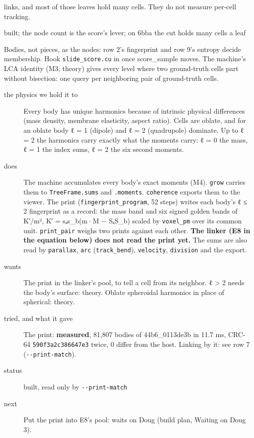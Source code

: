 \begin{description}
links, and most of those leaves hold many cells. They do not measure per-cell tracking.
\item[{status}] built; the node count is the score's lever; on 6bba the cut holds many cells a leaf
\item[{next}] Bodies, not pieces, as the nodes: row 2's fingerprint and row 9's entropy decide membership. Hook \texttt{slide\_\allowbreak{}score.\allowbreak{}cu} in once score\_\allowbreak{}sample moves. The machine's LCA identity (M3, theory) gives every level where two ground-truth cells part without bisection: one query per neighboring pair of ground-truth cells.
\end{description}

\begin{description}
\item[{the physics we hold it to}] Every body has unique harmonics because of intrinsic physical differences (mass density, membrane elasticity, aspect ratio). Cells are oblate, and for an oblate body ℓ = 1 (dipole) and ℓ = 2 (quadrupole) dominate. Up to ℓ = 2 the harmonics carry exactly what the moments carry: ℓ = 0 the mass, ℓ = 1 the index sums, ℓ = 2 the six second moments.
\item[{does}] The machine accumulates every body's exact moments (M4). \texttt{grow} carries them to \texttt{Tree\allowbreak{}Frame.\allowbreak{}sums} and \texttt{.\allowbreak{}moments}. \texttt{coherence} exports them to the viewer. The print (\texttt{fingerprint\_\allowbreak{}program}, 52 steps) writes each body's ℓ ≤ 2 fingerprint as a record: the mass band and six signed golden bands of K′/m², K′ = sₐs\_\allowbreak{}b(m·M − SₐS\_\allowbreak{}b) scaled by \texttt{voxel\_\allowbreak{}pm} over its common unit. \texttt{print\_\allowbreak{}pair} weighs two prints against each other. \textbf{The linker (E8 in the equation below) does not read the print yet.} The sums are also read by \texttt{parallax}, \texttt{arc} (\texttt{track\_\allowbreak{}bend}), \texttt{velocity}, \texttt{division} and the export.
\item[{wants}] The print in the linker's pool, to tell a cell from its neighbor. ℓ > 2 needs the body's surface: theory. Oblate spheroidal harmonics in place of spherical: theory.
\item[{tried, and what it gave}] The print: \textbf{measured}, 81,807 bodies of 44b6\_\allowbreak{}0113de3b in 11.7 ms, CRC-64 \texttt{590f3a2c386647e3} twice, 0 differ from the host. Linking by it: see row 7 (\texttt{-\allowbreak{}-\allowbreak{}print-\allowbreak{}match}).
\item[{status}] built, read only by \texttt{-\allowbreak{}-\allowbreak{}print-\allowbreak{}match}
\item[{next}] Put the print into E8's pool: waits on Doug (build plan, Waiting on Doug 3).
\end{description}

